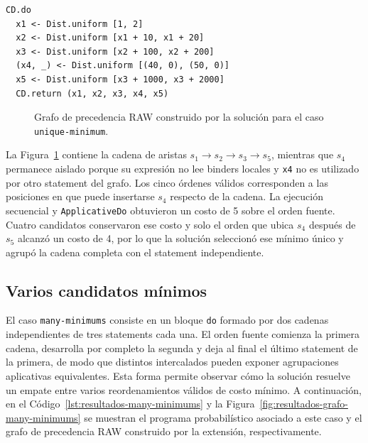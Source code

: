 \begin{lstlisting}[style=haskell,caption={Programa probabilístico asociado al caso \texttt{unique-minimum}.},label={lst:resultados-unique-minimum}]
CD.do
  x1 <- Dist.uniform [1, 2]
  x2 <- Dist.uniform [x1 + 10, x1 + 20]
  x3 <- Dist.uniform [x2 + 100, x2 + 200]
  (x4, _) <- Dist.uniform [(40, 0), (50, 0)]
  x5 <- Dist.uniform [x3 + 1000, x3 + 2000]
  CD.return (x1, x2, x3, x4, x5)
\end{lstlisting}

\begin{figure}[ht]
\centering
\begingroup
\setgraphnodesize{1.5cm}{0.95cm}{8pt}
\begin{PrecedenceGraph}[node distance=0.4cm and 0.35cm]
\end{PrecedenceGraph}
\endgroup
\caption[Grafo RAW del caso \texttt{unique-minimum}.]{Grafo de precedencia RAW construido por la solución para el caso \texttt{unique-minimum}.}
\label{fig:resultados-grafo-unique-minimum}
\end{figure}

La Figura~\ref{fig:resultados-grafo-unique-minimum} contiene la cadena de aristas $s_1\to s_2\to s_3\to s_5$, mientras que $s_4$ permanece aislado porque su expresión no lee binders locales y \texttt{x4} no es utilizado por otro statement del grafo. Los cinco órdenes válidos corresponden a las posiciones en que puede insertarse $s_4$ respecto de la cadena. La ejecución secuencial y \texttt{ApplicativeDo} obtuvieron un costo de 5 sobre el orden fuente. Cuatro candidatos conservaron ese costo y solo el orden que ubica $s_4$ después de $s_5$ alcanzó un costo de 4, por lo que la solución seleccionó ese mínimo único y agrupó la cadena completa con el statement independiente.

\subsection{Varios candidatos mínimos}

El caso \texttt{many-minimums} consiste en un bloque \texttt{do} formado por dos cadenas independientes de tres statements cada una. El orden fuente comienza la primera cadena, desarrolla por completo la segunda y deja al final el último statement de la primera, de modo que distintos intercalados pueden exponer agrupaciones aplicativas equivalentes. Esta forma permite observar cómo la solución resuelve un empate entre varios reordenamientos válidos de costo mínimo. A continuación, en el Código~\ref{lst:resultados-many-minimums} y la Figura~\ref{fig:resultados-grafo-many-minimums} se muestran el programa probabilístico asociado a este caso y el grafo de precedencia RAW construido por la extensión, respectivamente.

